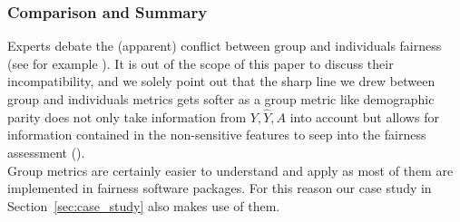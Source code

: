 

\subsubsection*{Comparison and Summary}
Experts debate the (apparent) conflict between group and individuals fairness (see for example \cite{Binns2020}).
It is out of the scope of this paper to discuss their incompatibility, and we solely point out that the sharp line we drew between group and individuals metrics gets softer as a group metric like demographic parity does not only take information from $Y, \hat{Y}, A$ into account but allows for information contained in the non-sensitive features to seep into the fairness assessment (\cite{castelnovo2022}).\\
Group metrics are certainly easier to understand and apply as most of them are implemented in fairness software packages. For this reason our case study in Section~\ref{sec:case_study} also makes use of them.



